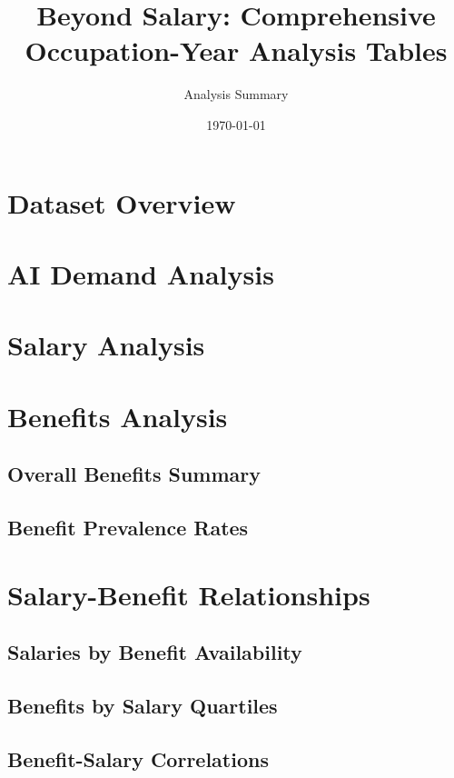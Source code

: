 \documentclass{article}
\title{Beyond Salary: Comprehensive Occupation-Year Analysis Tables}
\author{Analysis Summary}
\date{\today}
\begin{document}
\maketitle

\tableofcontents
\newpage

\section{Dataset Overview}


\section{AI Demand Analysis}


\section{Salary Analysis}


\section{Benefits Analysis}
\subsection{Overall Benefits Summary}


\subsection{Benefit Prevalence Rates}


\section{Salary-Benefit Relationships}
\subsection{Salaries by Benefit Availability}


\subsection{Benefits by Salary Quartiles}


\subsection{Benefit-Salary Correlations}

\end{document}
